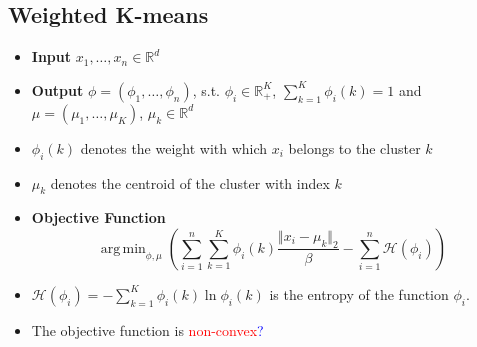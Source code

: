 \documentclass{article}
\DeclareMathOperator*{\argmin}{arg\,min}
\newcommand{\red}[1]{\textcolor{red}{#1}}
\newcommand{\blue}[1]{\textcolor{blue}{#1}}
\begin{document}

\subsection{Weighted K-means}

\begin{itemize}
    \item \textbf{Input} $x_1, \dots, x_n \in \mathbb{R}^d$
    \item \textbf{Output} $\phi=(\phi_1, \dots, \phi_n)$, s.t. $\phi_i \in \mathbb{R}^K_+$, $\sum_{k=1}^K\phi_i(k)=1$ and $\mu=(\mu_1, \dots, \mu_K)$, $\mu_k \in \mathbb{R}^d$
    \item $\phi_i(k)$ denotes the weight with which $x_i$ belongs to the cluster $k$
    \item $\mu_k$ denotes the centroid of the cluster with index $k$
    \item \textbf{Objective Function} $$\argmin_{\phi, \mu} \left( \sum_{i=1}^n \sum_{k=1}^K \phi_i(k) \frac{\Vert x_i-\mu_k \Vert_2}{\beta} - \sum_{i=1}^n\mathcal{H}(\phi_i) \right)$$
    \item $\mathcal{H}(\phi_i) = -\sum_{k=1}^K \phi_i(k)\ln{\phi_i(k)}$ is the entropy of the function $\phi_i$.
    \item The objective function is \red{non-convex}\blue{?}
\end{itemize}
\end{document}
